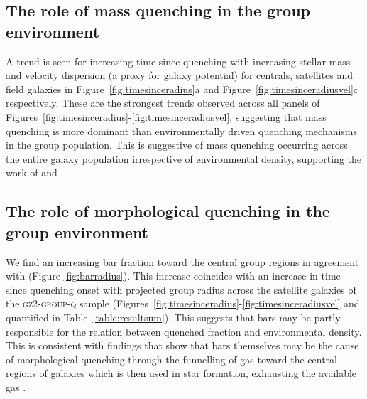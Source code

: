 \documentclass[useAMS,usenatbib]{mn2e}
\def\minor		{\color{minorcol}}
\begin{document}
\subsection{The role of mass quenching in the group environment}\label{sec:rolemassenv}

A trend is seen for increasing time since quenching with increasing stellar mass and velocity dispersion (a proxy for galaxy potential) for centrals, satellites and field galaxies in Figure~\ref{fig:timesinceradius}a and Figure~\ref{fig:timesinceradiusvel}c respectively. {\minor These are the strongest trends observed across all panels of Figures~\ref{fig:timesinceradius}-\ref{fig:timesinceradiusvel}, suggesting that mass quenching is more dominant than environmentally driven quenching mechanisms in the group population.} This is suggestive of mass quenching occurring across the entire galaxy population irrespective of environmental density, supporting the work of \citet{peng10, peng12, Gabor10} and \citet{darvish16}.

\subsection{The role of morphological quenching in the group environment}\label{sec:rolemorphenv}

We find an increasing bar fraction toward the central group regions in agreement with \cite{skibba12} (Figure \ref{fig:barradius}). This increase coincides with an increase in time since quenching onset with projected group radius across the satellite galaxies of the \textsc{gz2-group-q} sample (Figures~\ref{fig:timesinceradius}-\ref{fig:timesinceradiusvel} and quantified in Table~\ref{table:resultsum}). This suggests that bars may be partly responsible for the relation between quenched fraction and environmental density. This is consistent with findings that show that bars themselves may be the cause of morphological quenching through the funnelling of gas toward the central regions of galaxies \citep{athanassoula92b, sheth05} which is then used in star formation, exhausting the available gas \citep[][and see Section~\ref{sec:morphquench}]{masters12a}.

\end{document}
